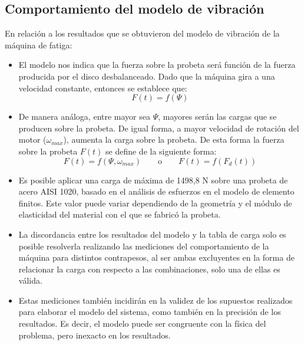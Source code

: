 \subsection{Comportamiento del modelo de vibración}
En relación a los resultados que se obtuvieron del modelo de vibración de la máquina de fatiga:
\begin{itemize}
	\item El modelo nos indica que la fuerza sobre la probeta será función de la fuerza producida por el disco desbalanceado. Dado que la máquina gira a una velocidad constante, entonces se establece que:
	\begin{equation*}
		F(t) = f(\Psi)
	\end{equation*}
	\item De manera análoga, entre mayor sea $\Psi$, mayores serán las cargas que se producen sobre la probeta. De igual forma, a mayor velocidad de rotación del motor ($\omega_{max}$), aumenta la carga sobre la probeta. De esta forma la fuerza sobre la probeta $F(t)$ se define de la siguiente forma:
	\begin{equation*}
		F(t) = f (\Psi, \omega_{max}) \qquad \text{o} \qquad F(t) = f(F_d(t))
	\end{equation*}
	\item Es posible aplicar una carga de máxima de 1498,8 N sobre una probeta de acero AISI 1020, basado en el análisis de esfuerzos en el modelo de elemento finitos. Este valor puede variar dependiendo de la geometría y el módulo de elasticidad del material con el que se fabricó la probeta.
	\item La discordancia entre los resultados del modelo y la tabla de carga solo es posible resolverla realizando las mediciones del comportamiento de la máquina para distintos contrapesos, al ser ambas excluyentes en la forma de relacionar la carga con respecto a las combinaciones, solo una de ellas es válida.
	\item Estas mediciones también incidirán en la validez de los supuestos realizados para elaborar el modelo del sistema, como también en la precisión de los resultados. Es decir, el modelo puede ser congruente con la física del problema, pero inexacto en los resultados.
\end{itemize}

